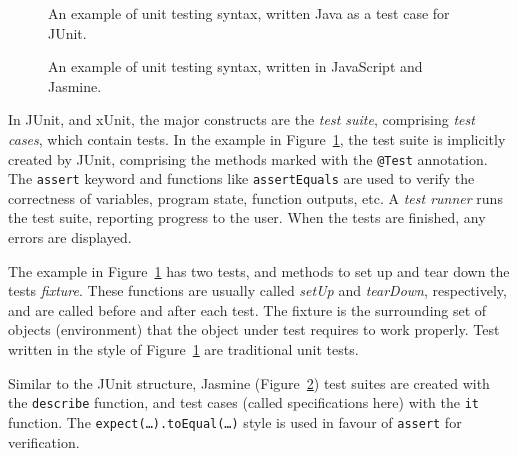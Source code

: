 \begin{figure}[h!]
	\begin{center}
	\begin{minipage}{0.9\textwidth}
		\lstset{language=Java}
		
	\end{minipage}
	\end{center}
  \caption{An example of unit testing syntax, written Java as a test case for
    JUnit.}
	\label{figure-junit}
\end{figure}

\begin{figure}[h!]
	\begin{center}
	\begin{minipage}{0.9\textwidth}
		\lstset{language=JavaScript}
		
	\end{minipage}
	\end{center}
  \caption{An example of unit testing syntax, written in JavaScript and
    Jasmine.}
	\label{figure-jasmine}
\end{figure}

In JUnit, and xUnit, the major constructs are the \textit{test suite},
comprising \textit{test cases}, which contain tests. In the example in
Figure~\ref{figure-junit}, the test suite is implicitly created by JUnit,
comprising the methods marked with the \texttt{@Test} annotation. The
\texttt{assert} keyword and functions like \texttt{assertEquals} are used to
verify the correctness of variables, program state, function outputs, etc. A
\textit{test runner} runs the test suite, reporting progress to the user. When
the tests are finished, any errors are displayed.

The example in Figure~\ref{figure-junit} has two tests, and methods to set
up and tear down the tests \textit{fixture}. These functions are usually called
\textit{setUp} and \textit{tearDown}, respectively, and are called before and
after each test. The fixture is the surrounding set of objects (environment)
that the object under test requires to work properly. Test written in the style
of Figure~\ref{figure-junit} are traditional unit tests.

Similar to the JUnit structure, Jasmine (Figure~\ref{figure-jasmine}) test
suites are created with the \texttt{describe} function, and test cases (called
specifications here) with the \texttt{it} function. The
\texttt{expect(\dots).toEqual(\dots)} style is used in favour of
\texttt{assert} for verification.

